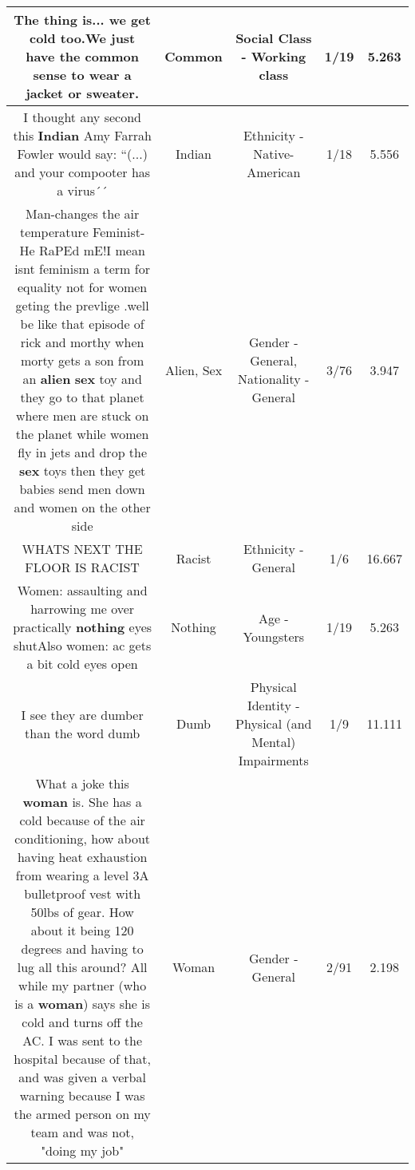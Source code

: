 \documentclass[11pt]{article}
\newlength\mylength
\begin{document}
\begin{center}
\begin{longtable}{|C{.65\mylength}|C{.30\mylength}|C{.12\mylength}|C{.12\mylength}|C{.12\mylength}|}
  \small The thing is... we get cold too.We just have the \textbf{common} sense to wear a jacket or sweater.\normalsize   & Common & Social Class - Working class & 1/19 & 5.263 \\  \hline
  \small I thought any second this \textbf{Indian} Amy Farrah Fowler would say: ``(...) and your compooter has a virus´´\normalsize   & Indian & Ethnicity - Native-American & 1/18 & 5.556 \\  \hline
  \small Man-changes the air temperature Feminist-He RaPEd mE!I mean isnt feminism a term for equality  not for women geting the prevlige .well be like that episode of rick and morthy when morty gets a son from an \textbf{alien} \textbf{sex} toy and they go to that planet where men are stuck on the planet while women fly in jets and drop the \textbf{sex} toys then they get babies send men down and women on the other side\normalsize   & Alien, Sex & Gender - General, Nationality - General & 3/76 & 3.947 \\  \hline
  \small WHATS NEXT THE FLOOR IS RACIST\normalsize   & Racist & Ethnicity - General & 1/6 & 16.667 \\  \hline
  \small Women: assaulting and harrowing me over practically \textbf{nothing} eyes shutAlso women: ac gets a bit cold eyes open\normalsize   & Nothing & Age - Youngsters & 1/19 & 5.263 \\  \hline
  \small I see they are dumber than the word dumb\normalsize   & Dumb & Physical Identity - Physical (and Mental) Impairments & 1/9 & 11.111 \\  \hline
  \small What a joke this \textbf{woman} is. She has a cold because of the air conditioning, how about having heat exhaustion from wearing a level 3A bulletproof vest with 50lbs of gear. How about it being 120 degrees and having to lug all this around? All while my partner  (who is a \textbf{woman}) says she is cold and turns off the AC. I was sent to the hospital because of that, and was given a verbal warning because I was the armed person on my team and was not, "doing my job"\normalsize   & Woman & Gender - General & 2/91 & 2.198 \\  \hline

\end{longtable}
\end{center}
\end{document}

